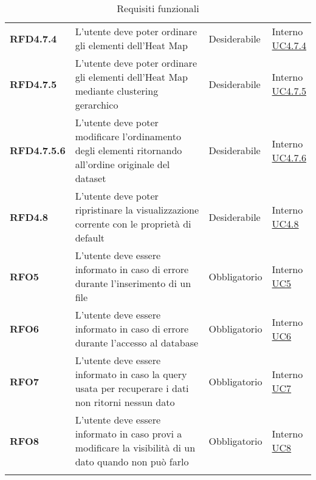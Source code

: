\begin{longtable}[H]{| >{\raggedright\bfseries}m{20mm} | >{\raggedright}m{90mm} | >{\centering}m{25mm} | >{\centering\arraybackslash}m{30mm}|}
    RFD4.7.4
    & L'utente deve poter ordinare gli elementi dell'Heat Map
    & Desiderabile
    & \makecell{ Interno \\  \hyperref[par:uc4.7.4]{UC4.7.4} }\\

    RFD4.7.5
    & L'utente deve poter ordinare gli elementi dell'Heat Map mediante clustering gerarchico
    & Desiderabile
    & \makecell{ Interno \\  \hyperref[spar:uc4.7.5]{UC4.7.5} }\\

    RFD4.7.5.6
    & L'utente deve poter modificare l'ordinamento degli elementi ritornando all'ordine originale del dataset
    & Desiderabile
    & \makecell{ Interno \\  \hyperref[spar:uc4.7.6]{UC4.7.6} }\\

    RFD4.8
    & L'utente deve poter ripristinare la visualizzazione corrente con le proprietà di default
    & Desiderabile
    & \makecell{ Interno \\  \hyperref[ssub:uc4.8]{UC4.8} }\\

    RFO5
    & L'utente deve essere informato in caso di errore durante l'inserimento di un file
    & Obbligatorio
    & \makecell{ Interno \\  \hyperref[sub:uc5]{UC5} }\\

    RFO6
    & L'utente deve essere informato in caso di errore durante l'accesso al database
    & Obbligatorio
    & \makecell{ Interno \\  \hyperref[sub:uc6]{UC6} }\\

    RFO7
    & L'utente deve essere informato in caso la query usata per recuperare i dati non ritorni nessun dato
    & Obbligatorio
    & \makecell{ Interno \\  \hyperref[sub:uc7]{UC7} }\\

    RFO8
    & L'utente deve essere informato in caso provi a modificare la visibilità di un dato quando non può farlo
    & Obbligatorio
    & \makecell{ Interno \\  \hyperref[sub:uc8]{UC8} }\\
    \hline
    \rowcolor{white}
    \caption{Requisiti funzionali}%
    \label{tab:requisiti_funzionali}
\end{longtable}
